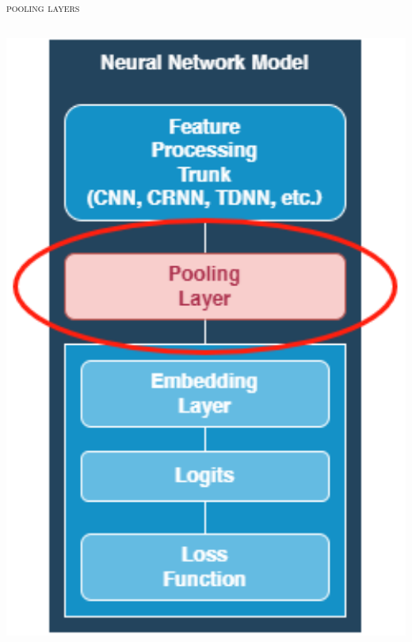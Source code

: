 \documentclass[10pt,aspectratio=1610,professionalfont]{beamer}
\begin{document}
\begin{frame}{\textsc{pooling layers}}
\begin{columns}
\begin{column}{0.3\textwidth}
\begin{center}
		     	\includegraphics[width=1.1\textwidth]{img/pooling_layer.png}
		    	\end{center}
		\end{column}
	\end{columns}
    
\end{frame}
\end{document}
